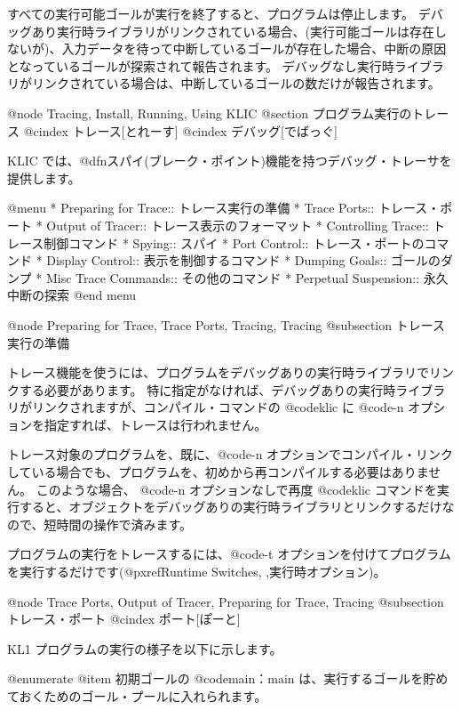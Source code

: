 {{{{すべての実行可能ゴールが実行を終了すると、プログラムは停止します。
デバッグあり実行時ライブラリがリンクされている場合、(実行可能ゴールは存在しないが)、入力データを待って中断しているゴールが存在した場合、中断の原因となっているゴールが探索されて報告されます。
デバッグなし実行時ライブラリがリンクされている場合は、中断しているゴールの数だけが報告されます。


@node Tracing, Install, Running, Using KLIC
@section プログラム実行のトレース
@cindex トレース[とれーす]
@cindex デバッグ[でばっぐ]

KLIC では、@dfn{スパイ}(ブレーク・ポイント)機能を持つデバッグ・トレーサを提供します。

@menu
* Preparing for Trace::         トレース実行の準備
* Trace Ports::                 トレース・ポート
* Output of Tracer::            トレース表示のフォーマット
* Controlling Trace::           トレース制御コマンド
* Spying::                      スパイ
* Port Control::                トレース・ポートのコマンド
* Display Control::             表示を制御するコマンド
* Dumping Goals::               ゴールのダンプ
* Misc Trace Commands::         その他のコマンド
* Perpetual Suspension::        永久中断の探索
@end menu

@node Preparing for Trace, Trace Ports, Tracing, Tracing
@subsection トレース実行の準備

トレース機能を使うには、プログラムをデバッグありの実行時ライブラリでリンクする必要があります。
特に指定がなければ、デバッグありの実行時ライブラリがリンクされますが、コンパイル・コマンドの @code{klic} に @code{-n} オプションを指定すれば、トレースは行われません。

トレース対象のプログラムを、既に、@code{-n} オプションでコンパイル・リンクしている場合でも、プログラムを、初めから再コンパイルする必要はありません。
このような場合、 @code{-n} オプションなしで再度 @code{klic} コマンドを実行すると、オブジェクトをデバッグありの実行時ライブラリとリンクするだけなので、短時間の操作で済みます。

プログラムの実行をトレースするには、@code{-t} オプションを付けてプログラムを実行するだけです(@pxref{Runtime Switches, ,実行時オプション})。

@node Trace Ports, Output of Tracer, Preparing for Trace, Tracing
@subsection トレース・ポート
@cindex ポート[ぽーと]

 KL1 プログラムの実行の様子を以下に示します。

@enumerate
@item
初期ゴールの @code{main：main} は、実行するゴールを貯めておくためのゴール・プールに入れられます。

}}}}

